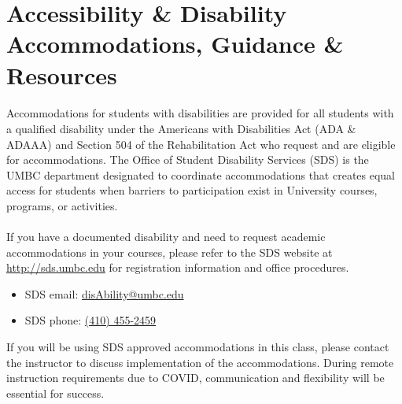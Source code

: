 \documentclass[letter,10pt]{article}
\begin{document}
\begin{comment}
Th Apr 24   & 13 & Object Oriented Design & & & Classwork 9 \\
Tu Apr 29   & 14 & Algorithm Design \& Recursion & & & \\ \hline
Th May 1    & 14 & Algorithm Design \& Recursion & 13 & & \\
Tu May 6    & 15 & \hl{Quiz 4} & & 9 & Classwork 10 \\
Th May 8    & 15 & Review & & & \\
Tu May 13  & 16 & Review & & & \\
Th May 15  & 16 & \hl{Final Exam, 6-8PM.} & & & \\
\end{tabular}
\end{comment}

\section*{Accessibility \& Disability Accommodations, Guidance \& Resources}
\paragraph{}Accommodations for students with disabilities are provided for all students with a qualified disability under the Americans with Disabilities Act (ADA \& ADAAA) and Section 504 of the Rehabilitation Act who request and are eligible for accommodations. The Office of Student Disability Services (SDS) is the UMBC department designated to coordinate accommodations that creates equal access for students when barriers to participation exist in University courses, programs, or activities.

\paragraph{}If you have a documented disability and need to request academic accommodations in your courses, please refer to the SDS website at \url{http://sds.umbc.edu} for registration information and office procedures.
\begin{itemize}
\item SDS email: \href{mailto:disAbility@umbc.edu}{disAbility@umbc.edu}
\item SDS phone: \href{tel:+14104552459}{(410) 455-2459}
\end{itemize}
If you will be using SDS approved accommodations in this class, please contact the instructor to discuss implementation of the accommodations. During remote instruction requirements due to COVID, communication and flexibility will be essential for success.
\end{document}

